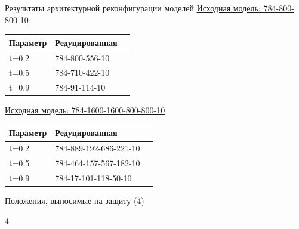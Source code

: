 \documentclass[10pt]{beamer}
\begin{document}
        \begin{frame}{Результаты архитектурной реконфигурации моделей}
            \underline{Исходная модель: 784-800-800-10}
            \begin{table} [!h]
              \small
                \centering
                \begin{tabular}{| p{2cm} | p{4cm} | p{4cm} |}
                \hline
                    \textbf{Параметр} & \textbf{Редуцированная}\\
                \hline
                t=0.2 & 784-800-556-10\\
                \hline
                t=0.5 & 784-710-422-10\\
                \hline
                t=0.9 & 784-91-114-10\\
                \hline
                \end{tabular}
                \end{table}

                \underline{Исходная модель: 784-1600-1600-800-800-10}
              \begin{table} [!h]
              \small
                \centering
                \begin{tabular}{| p{2cm} | p{4cm} | p{4cm} |}
                \hline
                    \textbf{Параметр} &  \textbf{Редуцированная}\\
                \hline
                t=0.2 & 784-889-192-686-221-10\\
                \hline
                t=0.5 & 784-464-157-567-182-10\\
                \hline
                t=0.9 & 784-17-101-118-50-10\\
                \hline
                \end{tabular}
            \end{table}
        \end{frame}

        \begin{frame}{Положения, выносимые на защиту (4)}
            \begin{block}{4}
                \large
            \end{block}
        \end{frame}
\end{document}
